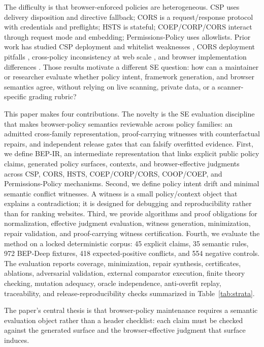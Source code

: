 \documentclass[10pt,conference]{IEEEtran}
\newcommand{\bep}{BEP-IR}
\begin{document}
The difficulty is that browser-enforced policies are heterogeneous. CSP uses delivery disposition and directive fallback; CORS is a request/response protocol with credentials and preflights; HSTS is stateful; COEP/CORP/CORS interact through request mode and embedding; Permissions-Policy uses allowlists. Prior work has studied CSP deployment and whitelist weaknesses \cite{weichselbaum_csp_dead_2016,calzavara_content_security_problems_2016,calzavara_csp_semantics_2018,roth_complex_csp_2020}, CORS deployment pitfalls \cite{chen_cors_2018}, cross-policy inconsistency at web scale \cite{calzavara_site_policy_2021}, and browser implementation differences \cite{wi_diffcsp_2023}. Those results motivate a different SE question: how can a maintainer or researcher evaluate whether policy intent, framework generation, and browser semantics agree, without relying on live scanning, private data, or a scanner-specific grading rubric?

This paper makes four contributions. The novelty is the SE evaluation discipline that makes browser-policy semantics reviewable across policy families: an admitted cross-family representation, proof-carrying witnesses with counterfactual repairs, and independent release gates that can falsify overfitted evidence.
First, we define \bep, an intermediate representation that links explicit public policy claims, generated policy surfaces, contexts, and browser-effective judgments across CSP, CORS, HSTS, COEP/CORP/CORS, COOP/COEP, and Permissions-Policy mechanisms.
Second, we define policy intent drift and minimal semantic conflict witnesses. A witness is a small policy/context object that explains a contradiction; it is designed for debugging and reproducibility rather than for ranking websites.
Third, we provide algorithms and proof obligations for normalization, effective judgment evaluation, witness generation, minimization, repair validation, and proof-carrying witness certification.
Fourth, we evaluate the method on a locked deterministic corpus: 45 explicit claims, 35 semantic rules, 972 BEP-Deep fixtures, 418 expected-positive conflicts, and 554 negative controls. The evaluation reports coverage, minimization, repair synthesis, certificates, ablations, adversarial validation, external comparator execution, finite theory checking, mutation adequacy, oracle independence, anti-overfit replay, traceability, and release-reproducibility checks summarized in Table~\ref{tab:strata}.

The paper's central thesis is that browser-policy maintenance requires a semantic evaluation object rather than a header checklist: each claim must be checked against the generated surface and the browser-effective judgment that surface induces.
\end{document}

